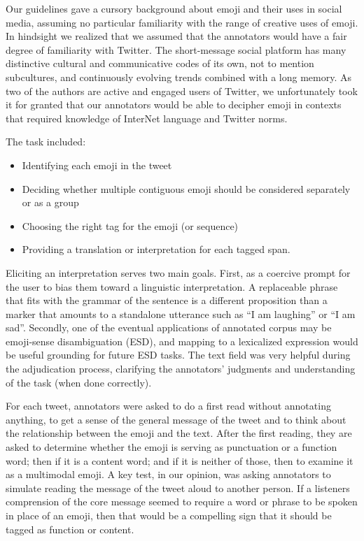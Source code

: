 \documentclass[11pt]{article}
\begin{document}
Our guidelines gave a cursory background about emoji and their uses in social media, assuming no particular
familiarity with the range of creative uses of emoji. In hindsight we realized that we assumed that the
annotators would have a fair degree of familiarity with Twitter. The short-message social
platform has many distinctive cultural and communicative codes of its own, not to mention subcultures, and
continuously evolving trends combined with a long memory. As two of the authors are active and engaged
users of Twitter, we unfortunately took it for granted that our annotators would be able to decipher emoji
in contexts that required knowledge of InterNet language and Twitter norms.

The task included:



\begin{itemize}
  \item  Identifying each emoji in the tweet 
  \item  Deciding whether multiple contiguous emoji should be considered separately or as a group
  \item  Choosing the right tag for the emoji (or sequence)
  \item  Providing a translation or interpretation for each tagged span.
\end{itemize}

Eliciting an interpretation serves two main goals. First, as a coercive prompt for the user to bias them
toward a linguistic interpretation. A replaceable phrase that fits with the grammar of the sentence is a
different proposition than a marker that amounts to a standalone utterance such as ``I am laughing'' or ``I am sad''.
Secondly, one of the eventual applications of annotated corpus may be emoji-sense disambiguation (ESD), and mapping
to a lexicalized expression would be useful grounding for future ESD tasks. The text field was very helpful
during the adjudication process, clarifying the annotators' judgments and understanding of the task (when
done correctly).

For each tweet, annotators were asked to do a first read without annotating anything, to get a sense of the
general message of the tweet and to think about the relationship between the emoji and the text. After the
first reading, they are asked to determine whether the emoji is serving as punctuation or a function word;
then if it is a content word; and if it is neither of those, then to examine it as a multimodal emoji.
A key test, in our opinion, was asking annotators to simulate reading the message of the tweet aloud to
another person.  If a listeners comprension of the core message seemed to require a word or phrase to be spoken
in place of an emoji, then that would be a compelling sign that it should be tagged as function or content.
\end{document}
